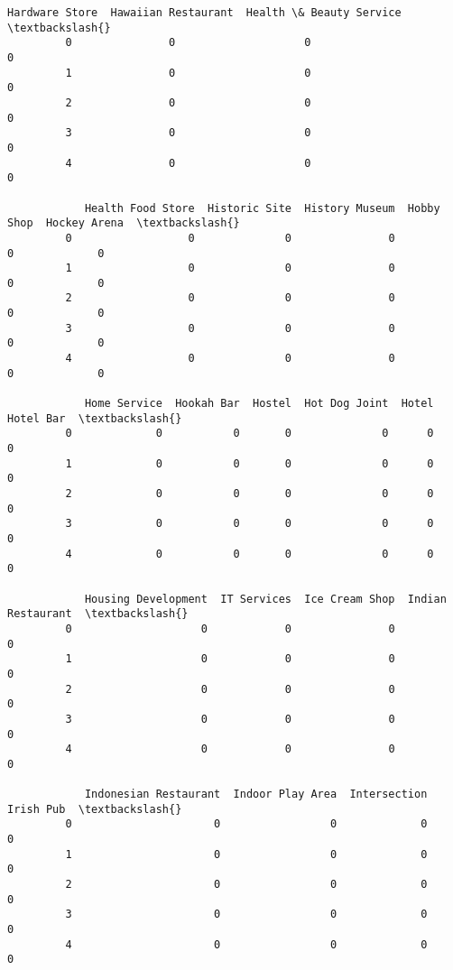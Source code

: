 \documentclass[11pt]{article}
\begin{document}
\begin{Verbatim}[commandchars=\\\{\}]
            Hardware Store  Hawaiian Restaurant  Health \& Beauty Service  \textbackslash{}
         0               0                    0                        0   
         1               0                    0                        0   
         2               0                    0                        0   
         3               0                    0                        0   
         4               0                    0                        0   
         
            Health Food Store  Historic Site  History Museum  Hobby Shop  Hockey Arena  \textbackslash{}
         0                  0              0               0           0             0   
         1                  0              0               0           0             0   
         2                  0              0               0           0             0   
         3                  0              0               0           0             0   
         4                  0              0               0           0             0   
         
            Home Service  Hookah Bar  Hostel  Hot Dog Joint  Hotel  Hotel Bar  \textbackslash{}
         0             0           0       0              0      0          0   
         1             0           0       0              0      0          0   
         2             0           0       0              0      0          0   
         3             0           0       0              0      0          0   
         4             0           0       0              0      0          0   
         
            Housing Development  IT Services  Ice Cream Shop  Indian Restaurant  \textbackslash{}
         0                    0            0               0                  0   
         1                    0            0               0                  0   
         2                    0            0               0                  0   
         3                    0            0               0                  0   
         4                    0            0               0                  0   
         
            Indonesian Restaurant  Indoor Play Area  Intersection  Irish Pub  \textbackslash{}
         0                      0                 0             0          0   
         1                      0                 0             0          0   
         2                      0                 0             0          0   
         3                      0                 0             0          0   
         4                      0                 0             0          0   
         

\end{Verbatim}
\end{document}
